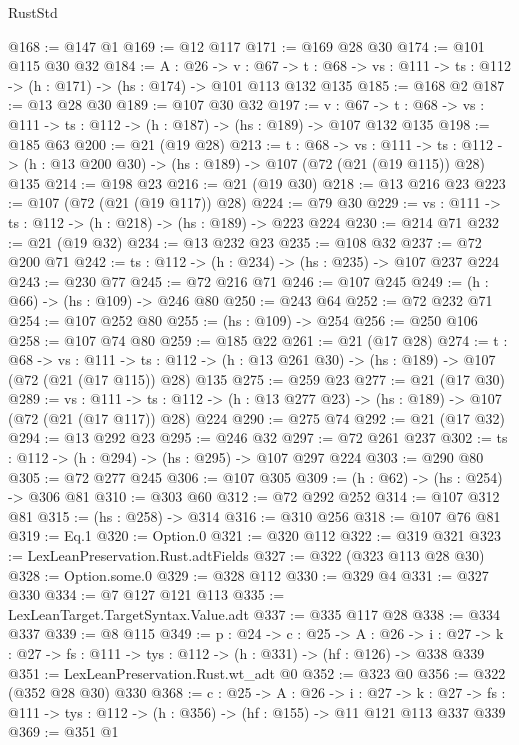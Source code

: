 \begin{lexlean}{RustStd}
\begin{coremodule}
@168 := @147 @1
@169 := @12 @117
@171 := @169 @28 @30
@174 := @101 @115 @30 @32
@184 := {A : @26} ->
  {v : @67} ->
  {t : @68} -> {vs : @111} -> {ts : @112} -> (h : @171) -> (hs : @174) -> @101 @113 @132 @135
@185 := @168 @2
@187 := @13 @28 @30
@189 := @107 @30 @32
@197 := {v : @67} ->
  {t : @68} -> {vs : @111} -> {ts : @112} -> (h : @187) -> (hs : @189) -> @107 @132 @135
@198 := @185 @63
@200 := @21 (@19 @28)
@213 := {t : @68} ->
  {vs : @111} ->
  {ts : @112} -> (h : @13 @200 @30) -> (hs : @189) -> @107 (@72 (@21 (@19 @115)) @28) @135
@214 := @198 @23
@216 := @21 (@19 @30)
@218 := @13 @216 @23
@223 := @107 (@72 (@21 (@19 @117)) @28)
@224 := @79 @30
@229 := {vs : @111} -> {ts : @112} -> (h : @218) -> (hs : @189) -> @223 @224
@230 := @214 @71
@232 := @21 (@19 @32)
@234 := @13 @232 @23
@235 := @108 @32
@237 := @72 @200 @71
@242 := {ts : @112} -> (h : @234) -> (hs : @235) -> @107 @237 @224
@243 := @230 @77
@245 := @72 @216 @71
@246 := @107 @245
@249 := (h : @66) -> (hs : @109) -> @246 @80
@250 := @243 @64
@252 := @72 @232 @71
@254 := @107 @252 @80
@255 := (hs : @109) -> @254
@256 := @250 @106
@258 := @107 @74 @80
@259 := @185 @22
@261 := @21 (@17 @28)
@274 := {t : @68} ->
  {vs : @111} ->
  {ts : @112} -> (h : @13 @261 @30) -> (hs : @189) -> @107 (@72 (@21 (@17 @115)) @28) @135
@275 := @259 @23
@277 := @21 (@17 @30)
@289 := {vs : @111} ->
  {ts : @112} -> (h : @13 @277 @23) -> (hs : @189) -> @107 (@72 (@21 (@17 @117)) @28) @224
@290 := @275 @74
@292 := @21 (@17 @32)
@294 := @13 @292 @23
@295 := @246 @32
@297 := @72 @261 @237
@302 := {ts : @112} -> (h : @294) -> (hs : @295) -> @107 @297 @224
@303 := @290 @80
@305 := @72 @277 @245
@306 := @107 @305
@309 := (h : @62) -> (hs : @254) -> @306 @81
@310 := @303 @60
@312 := @72 @292 @252
@314 := @107 @312 @81
@315 := (hs : @258) -> @314
@316 := @310 @256
@318 := @107 @76 @81
@319 := Eq.{1}
@320 := Option.{0}
@321 := @320 @112
@322 := @319 @321
@323 := LexLeanPreservation.Rust.adtFields
@327 := @322 (@323 @113 @28 @30)
@328 := Option.some.{0}
@329 := @328 @112
@330 := @329 @4
@331 := @327 @330
@334 := @7 @127 @121 @113
@335 := LexLeanTarget.TargetSyntax.Value.adt
@337 := @335 @117 @28
@338 := @334 @337
@339 := @8 @115
@349 := {p : @24} ->
  {c : @25} ->
  {A : @26} ->
  {i : @27} -> {k : @27} -> {fs : @111} -> {tys : @112} -> (h : @331) -> (hf : @126) -> @338 @339
@351 := LexLeanPreservation.Rust.wt_adt @0
@352 := @323 @0
@356 := @322 (@352 @28 @30) @330
@368 := {c : @25} ->
  {A : @26} ->
  {i : @27} ->
  {k : @27} -> {fs : @111} -> {tys : @112} -> (h : @356) -> (hf : @155) -> @11 @121 @113 @337 @339
@369 := @351 @1

\end{coremodule}
\end{lexlean}
